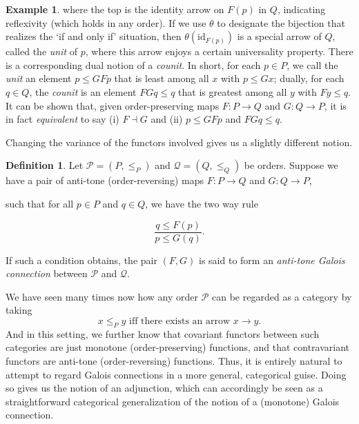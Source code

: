 \documentclass[11pt]{book}
\theoremstyle{definition}
\newtheorem{example}{Example}[section]
\theoremstyle{definition}
\newtheorem{definition}{Definition}[section]
\theoremstyle{definition}
\theoremstyle{theorem}
\theoremstyle{definition}
\begin{document}
\begin{example}
where the top is the identity arrow on $F(p)$ in $Q$, indicating reflexivity (which holds in any order). If we use $\theta$ to designate the bijection that realizes the `if and only if' situation, then $\theta(\text{id}_{F(p)})$ is a special arrow of $Q$, called the \textit{unit}  of $p$, where this arrow enjoys a certain universality property. There is a corresponding dual notion of a \textit{counit}. In short, for each $p \in P$, we call the \textit{unit} an element $p \leq GFp$ that is least among all $x$ with $p \leq Gx$; dually, for each $q \in Q$, the \textit{counit} is an element $FGq \leq q$ that is greatest among all $y$ with $Fy \leq q$. It can be shown that, given order-preserving maps $F: P \rightarrow Q$ and $G: Q \rightarrow P$, it is in fact \textit{equivalent} to say (i) $F \dashv G$ and (ii) $p \leq GFp$ and $FGq \leq q$.  
\par 
Changing the variance of the functors involved gives us a slightly different notion. 
\begin{definition}
	 Let $\mathcal{P} = (P, \leq_P)$ and $\mathcal{Q} = (Q, \leq_Q)$ be orders. Suppose we have a pair of anti-tone (order-reversing)  maps $F: P \rightarrow Q$ and $G: Q \rightarrow P$, 
	 \begin{center}  
	 \end{center} 
	 such that for all $p \in P$ and $q \in Q$, we have the two way rule 
	 \begin{center} 
	 	\begin{equation*}
	 	\frac{q \leq F(p)}{p \leq G(q)} . 
	 	\end{equation*}
	 \end{center}  
 If such a condition obtains, the pair $(F, G)$ is said to form an \textit{anti-tone Galois connection} between $\mathcal{P}$ and $\mathcal{Q}$. 
\end{definition}
We have seen many times now how any order $\mathcal{P}$ can be regarded as a category by taking
\begin{equation*}
x \leq_P y \text{ iff there exists an arrow } x \rightarrow y.
\end{equation*}
And in this setting, we further know that covariant functors between such categories are just monotone (order-preserving) functions, and that contravariant functors are anti-tone (order-reversing) functions. Thus, it is entirely natural to attempt to regard Galois connections in a more general, categorical guise. Doing so gives us the notion of an adjunction, which can accordingly be seen as a straightforward categorical generalization of the notion of a (monotone) Galois connection. 

\end{example}
\end{document}
